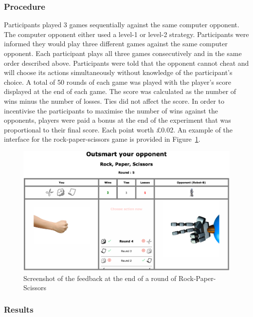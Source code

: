 \documentclass[man,floatsintext]{apa6}
\begin{document}
\hypertarget{procedure}{%
\subsubsection{Procedure}\label{procedure}}

Participants played 3 games sequentially against the same computer opponent. The computer opponent either used a level-1 or level-2 strategy. Participants were informed they would play three different games against the same computer opponent. Each participant plays all three games consecutively and in the same order described above. Participants were told that the opponent cannot cheat and will choose its actions simultaneously without knowledge of the participant's choice. A total of 50 rounds of each game was played with the player's score displayed at the end of each game. The score was calculated as the number of wins minus the number of losses. Ties did not affect the score. In order to incentivise the participants to maximise the number of wins against the opponents, players were paid a bonus at the end of the experiment that was proportional to their final score. Each point worth £0.02. An example of the interface for the rock-paper-scissors game is provided in Figure~\ref{fig:feedback-rps-exp2}.

\begin{figure}

{\centering \includegraphics{images/feedback_rps} 

}

\caption{Screenshot of the feedback at the end of a round of Rock-Paper-Scissors}\label{fig:feedback-rps-exp2}
\end{figure}

\hypertarget{results}{%
\subsubsection{Results}\label{results}}
\end{document}

